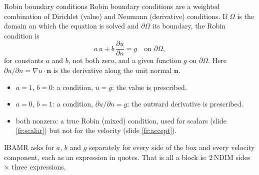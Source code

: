 \documentclass[aspectratio=169,11pt]{beamer}
\begin{document}
\begin{frame}{Robin boundary conditions}
\label{fr:robin}
\small Robin boundary conditions are a weighted combination of Dirichlet (value) and Neumann (derivative) conditions. If $\Omega$ is the domain on which the equation is solved and $\partial\Omega$ its boundary, the Robin condition is
\[
  a\,u + b\,\frac{\partial u}{\partial n} = g \quad\text{on } \partial\Omega,
\]
for constants $a$ and $b$, not both zero, and a given function $g$ on $\partial\Omega$. Here $\partial u/\partial n = \nabla u\cdot\mathbf{n}$ is the derivative along the  unit normal $\mathbf{n}$.
\begin{itemize}
  \item $a = 1$, $b = 0$: a  condition, $u = g$: the value is prescribed.
  \item $a = 0$, $b = 1$: a  condition, $\partial u/\partial n = g$: the outward derivative is prescribed.
  \item both nonzero: a true Robin (mixed) condition, used for scalars (slide \ref{fr:scalar}) but not for the velocity (slide \ref{fr:accept}).
\end{itemize}
\vspace{1mm}
\begin{punchbox}
\small IBAMR asks for $a$, $b$ and $g$ separately for every side of the box and every velocity component, each as an expression in quotes. That is all a  block is: $2\,\mathrm{NDIM}$ sides $\times$ three expressions.
\end{punchbox}
\end{frame}
\end{document}
